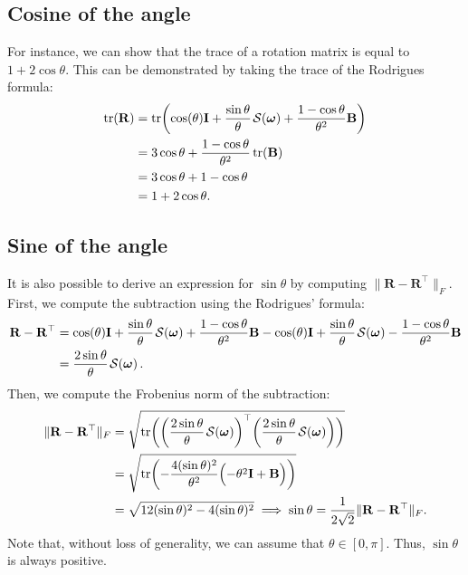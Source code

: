 \subsection{Cosine of the angle}
For instance, we can show that the trace of a rotation matrix is equal to $1+2\cos\theta$. This can be demonstrated by taking the trace of the Rodrigues formula:
\begin{align}
    \tr(\mathbf{R}) &= \tr\biggl(\cos(\theta)\mathbf{I} + \frac{\sin\theta}{\theta}\SL[\boldsymbol{\omega}] + \frac{1-\cos\theta}{\theta^2}\mathbf{B}\biggr)\\
    &= 3\cos\theta + \frac{1-\cos\theta}{\theta^2}\tr(\mathbf{B})\\
    &= 3\cos\theta + 1-\cos\theta\\
    &= 1+2\cos\theta.
\end{align}

\subsection{Sine of the angle}
It is also possible to derive an expression for $\sin\theta$ by computing $\|\mathbf{R} - \mathbf{R}^\top\|_F$. First, we compute the subtraction using the Rodrigues' formula:
\begin{align}
        \mathbf{R} - \mathbf{R}^\top &= \cos(\theta)\mathbf{I} + \frac{\sin\theta}{\theta}\SL[\boldsymbol{\omega}] + \frac{1-\cos\theta}{\theta^2}\mathbf{B} - \cos(\theta)\mathbf{I} + \frac{\sin\theta}{\theta}\SL[\boldsymbol{\omega}] - \frac{1-\cos\theta}{\theta^2}\mathbf{B}\nonumber\\
        &= \frac{2\sin\theta}{\theta}\SL[\boldsymbol{\omega}].
\end{align}
Then, we compute the Frobenius norm of the subtraction:
\begin{align}
    \|\mathbf{R} - \mathbf{R}^\top\|_F &= \sqrt{\tr\biggl(\biggl(\frac{2\sin\theta}{\theta}\SL[\boldsymbol{\omega}]\biggr)^\top\biggl(\frac{2\sin\theta}{\theta}\SL[\boldsymbol{\omega}]\biggr)\biggr)}\\
    &= \sqrt{\tr\biggl(-\frac{4(\sin\theta)^2}{\theta^2}\Bigl( -\theta^2\mathbf{I} + \mathbf{B}\Bigr)\biggr)}\\
    &=\sqrt{ 12(\sin\theta)^2 - 4(\sin\theta)^2}
    \implies \sin\theta = \frac{1}{2\sqrt{2}}\|\mathbf{R} - \mathbf{R}^\top\|_F.
\end{align}
Note that, without loss of generality, we can assume that $\theta\in[0,\pi]$. Thus, $\sin\theta$ is always positive.
